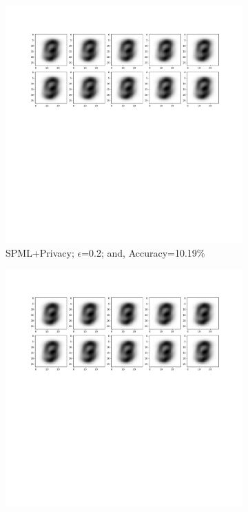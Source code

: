 \begin{figure}
\begin{subfigure}{.325\textwidth}
         \includegraphics[width=\textwidth]{images/Hw_attack/Mnistattack.2.pdf}
         \vspace{-8em}
         \caption{SPML+Privacy; $\epsilon$=0.2; and, Accuracy=10.19\%}
         \label{default}
     \end{subfigure}
     \begin{subfigure}{.325\textwidth}
         \includegraphics[width=\textwidth]{images/Hw_attack/Mnistattack1.pdf}

\end{subfigure}
\end{figure}
